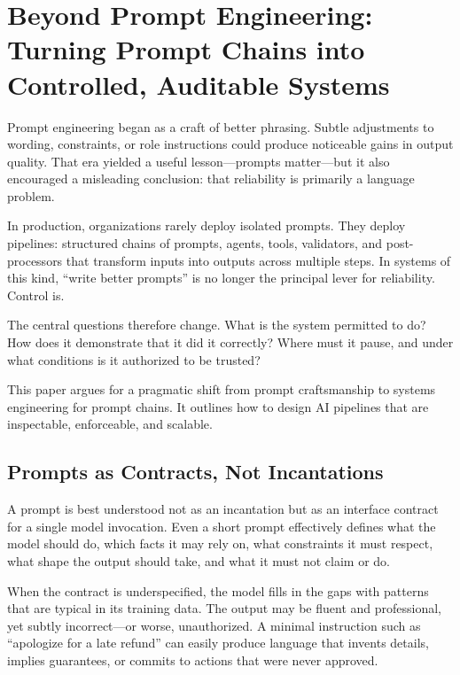 
\section{Beyond Prompt Engineering: Turning Prompt Chains into Controlled, Auditable Systems}

Prompt engineering began as a craft of better phrasing. Subtle adjustments to wording, constraints, or role instructions could produce noticeable gains in output quality. That era yielded a useful lesson---prompts matter---but it also encouraged a misleading conclusion: that reliability is primarily a language problem.

In production, organizations rarely deploy isolated prompts. They deploy pipelines: structured chains of prompts, agents, tools, validators, and post-processors that transform inputs into outputs across multiple steps. In systems of this kind, ``write better prompts'' is no longer the principal lever for reliability. Control is.

The central questions therefore change. What is the system permitted to do? How does it demonstrate that it did it correctly? Where must it pause, and under what conditions is it authorized to be trusted?

This paper argues for a pragmatic shift from prompt craftsmanship to systems engineering for prompt chains. It outlines how to design AI pipelines that are inspectable, enforceable, and scalable. 

\subsection{Prompts as Contracts, Not Incantations}
A prompt is best understood not as an incantation but as an interface contract for a single model invocation. Even a short prompt effectively defines what the model should do, which facts it may rely on, what constraints it must respect, what shape the output should take, and what it must not claim or do.

When the contract is underspecified, the model fills in the gaps with patterns that are typical in its training data. The output may be fluent and professional, yet subtly incorrect---or worse, unauthorized. A minimal instruction such as ``apologize for a late refund'' can easily produce language that invents details, implies guarantees, or commits to actions that were never approved.

